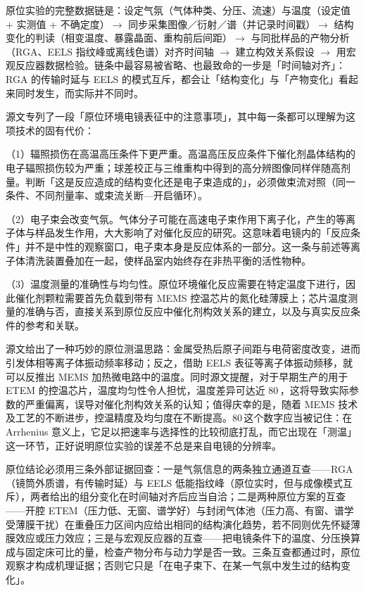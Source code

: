 \begin{dataflow}
原位实验的完整数据链是：设定气氛（气体种类、分压、流速）与温度（设定值 $+$ 实测值 $+$ 不确定度）$\to$ 同步采集图像／衍射／谱（并记录时间戳）$\to$ 结构变化的判读（相变温度、暴露晶面、重构前后间距）$\to$ 与同批样品的产物分析（RGA、EELS 指纹峰或离线色谱）对齐时间轴 $\to$ 建立构效关系假设 $\to$ 用宏观反应器数据检验。链条中最容易被省略、也最致命的一步是「时间轴对齐」：RGA 的传输时延与 EELS 的模式互斥，都会让「结构变化」与「产物变化」看起来同时发生，而实际并不同时。
\end{dataflow}

\begin{pitfall}
源文专列了一段「原位环境电镜表征中的注意事项」，其中每一条都可以理解为这项技术的固有代价：

（1）辐照损伤在高温高压条件下更严重。高温高压反应条件下催化剂晶体结构的电子辐照损伤较为严重；球差校正与三维重构中得到的高分辨图像同样伴随高剂量。判断「这是反应造成的结构变化还是电子束造成的」，必须做束流对照（同一条件、不同剂量率、或束流关断—开启循环）。

（2）电子束会改变气氛。气体分子可能在高速电子束作用下离子化，产生的等离子体与样品发生作用，大大影响了对催化反应的研究。这意味着电镜内的「反应条件」并不是中性的观察窗口，电子束本身是反应体系的一部分。这一条与前述等离子体清洗装置叠加在一起，使样品室内始终存在非热平衡的活性物种。

（3）温度测量的准确性与均匀性。原位环境催化反应需要在特定温度下进行，因此催化剂颗粒需要首先负载到带有 MEMS 控温芯片的氮化硅薄膜上；芯片温度测量的准确与否，直接关系到原位反应中催化剂构效关系的建立，以及与真实反应条件的参考和关联。

源文给出了一种巧妙的原位测温思路：金属受热后原子间距与电荷密度改变，进而引发体相等离子体振动频率移动；反之，借助 EELS 表征等离子体振动频移，就可以反推出 MEMS 加热微电路中的温度。同时源文提醒，对于早期生产的用于 ETEM 的控温芯片，温度均匀性令人担忧，温度差异可达近 80\,\degC，这将导致实际参数的严重偏离，误导对催化剂构效关系的认知；值得庆幸的是，随着 MEMS 技术及工艺的不断进步，控温精度及均匀度在不断提高。80\,\degC 这个数字应当被记住：在 Arrhenius 意义上，它足以把速率与选择性的比较彻底打乱，而它出现在「测温」这一环节，正好说明原位实验的误差不总是来自电镜的分辨率。
\end{pitfall}

\begin{crosscheck}
原位结论必须用三条外部证据回查：一是气氛信息的两条独立通道互查——RGA（镜筒外质谱，有传输时延）与 EELS 低能指纹峰（原位实时，但与成像模式互斥），两者给出的组分变化在时间轴对齐后应当自洽；二是两种原位方案的互查——开腔 ETEM（压力低、无窗、谱学好）与封闭气体池（压力高、有窗、谱学受薄膜干扰）在重叠压力区间内应给出相同的结构演化趋势，若不同则优先怀疑薄膜效应或压力效应；三是与宏观反应器的互查——把电镜条件下的温度、分压换算成与固定床可比的量，检查产物分布与动力学是否一致。三条互查都通过时，原位观察才构成机理证据；否则它只是「在电子束下、在某一气氛中发生过的结构变化」。
\end{crosscheck}

